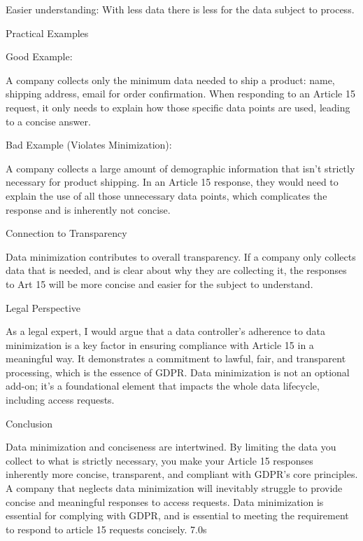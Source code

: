         Easier understanding: With less data there is less for the data subject to process.

Practical Examples

    Good Example:

        A company collects only the minimum data needed to ship a product: name, shipping address, email for order confirmation. When responding to an Article 15 request, it only needs to explain how those specific data points are used, leading to a concise answer.

    Bad Example (Violates Minimization):

        A company collects a large amount of demographic information that isn't strictly necessary for product shipping. In an Article 15 response, they would need to explain the use of all those unnecessary data points, which complicates the response and is inherently not concise.

Connection to Transparency

Data minimization contributes to overall transparency. If a company only collects data that is needed, and is clear about why they are collecting it, the responses to Art 15 will be more concise and easier for the subject to understand.

Legal Perspective

As a legal expert, I would argue that a data controller's adherence to data minimization is a key factor in ensuring compliance with Article 15 in a meaningful way. It demonstrates a commitment to lawful, fair, and transparent processing, which is the essence of GDPR. Data minimization is not an optional add-on; it's a foundational element that impacts the whole data lifecycle, including access requests.

Conclusion

Data minimization and conciseness are intertwined. By limiting the data you collect to what is strictly necessary, you make your Article 15 responses inherently more concise, transparent, and compliant with GDPR's core principles. A company that neglects data minimization will inevitably struggle to provide concise and meaningful responses to access requests. Data minimization is essential for complying with GDPR, and is essential to meeting the requirement to respond to article 15 requests concisely.
7.0s
